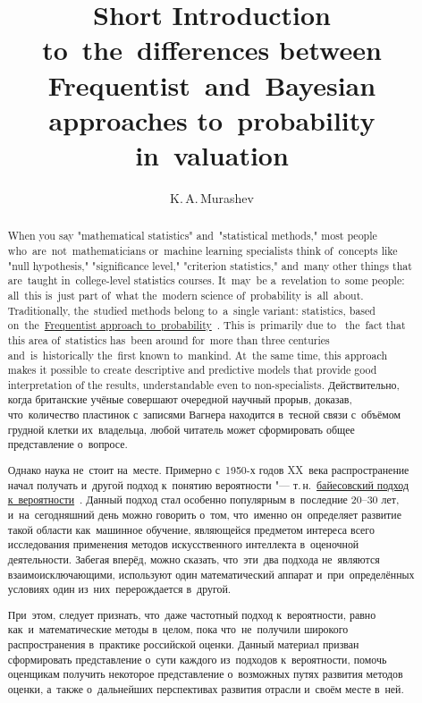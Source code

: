 \documentclass[]{scrartcl}
\title{Short Introduction to~the~differences between Frequentist~and~Bayesian approaches to~probability in~valuation}
\author{K.\,A.\,Murashev}
\begin{document}
\maketitle

\begin{abstract}
	When you say "mathematical statistics" and~"statistical methods," most people who~are~not~mathematicians or~machine learning specialists think of~concepts like "null hypothesis," "significance level," "criterion statistics," and~many other things that are~taught in~college-level statistics courses. It~may~be a~revelation to~some people: all~this is~just part of~what the~modern science of~probability is~all~about. Traditionally, the~studied methods belong to~a~single variant: statistics, based on~the~\href{https://en.wikipedia.org/wiki/Frequentist_probability}{Frequentist approach to~probability}~\cite{Wiki:Freq-probability-eng}. This is~primarily due to~ the~fact that this area of~statistics has~been around for~more than three centuries and~is~historically the~first known to~mankind. At~the same time, this approach makes it possible to create descriptive and predictive models that provide good interpretation of the results, understandable even to non-specialists. Действительно, когда британские учёные совершают очередной научный прорыв, доказав, что~количество пластинок с~записями Вагнера находится в~тесной связи с~объёмом грудной клетки их~владельца, любой читатель может сформировать общее представление о~вопросе.
	
	Однако наука не~стоит на~месте. Примерно с~1950-х годов XX~века распространение начал получать и~другой подход к~понятию вероятности "--- т.\,н.~\href{https://ru.wikipedia.org/wiki/Байесовская_вероятность}{байесовский подход к~вероятности}~\cite{Wiki:Bayes-prob}. Данный подход стал особенно популярным в~последние 20--30 лет, и~на~сегодняшний день можно говорить о~том, что~именно он~определяет развитие такой области как~машинное обучение, являющейся предметом интереса всего исследования применения методов искусственного интеллекта в~оценочной деятельности. Забегая вперёд, можно сказать, что~эти~два подхода не~являются взаимоисключающими, используют один математический аппарат и~при~определённых условиях один из~них~перерождается в~другой.
	
	При~этом, следует признать, что~даже частотный подход к~вероятности, равно как~и~математические методы в~целом, пока что~не~получили широкого распространения в~практике российской оценки. Данный материал призван сформировать представление о~сути каждого из~подходов к~вероятности, помочь оценщикам получить некоторое представление о~возможных путях развития методов оценки, а~также о~дальнейших перспективах развития отрасли и~своём месте в~ней. 
\end{abstract}
\end{document}
